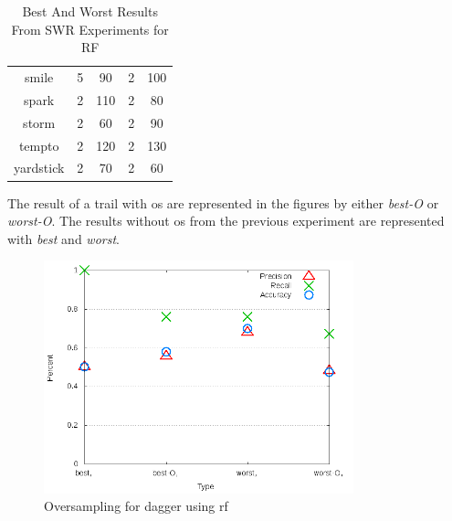 \begin{table}[ht]
\begin{center}
\begin{tabular}{|c|c|c|c|c|}
        smile & 5 & 90 & 2 & 100 \\
        spark & 2 & 110 & 2 & 80 \\
        storm & 2 & 60 & 2 & 90 \\
        tempto & 2 & 120 & 2 & 130 \\
        yardstick & 2 & 70 & 2 & 60 \\
        \hline
    \end{tabular}
    \caption{Best And Worst Results From SWR Experiments for RF}
    \label{tab:rf_best_worst_swr_experiment_sets}
\end{center}
\end{table}

The result of a trail with \gls{os} are represented in the figures by either \textit{best-O} or \textit{worst-O}. The results without \gls{os} from the previous experiment are represented with \textit{best} and \textit{worst}.


\begin{figure}[!ht]
    \centering
        \includegraphics[width=0.8\textwidth]{images/rf/test_4/dagger_sample_range}
        \caption{Oversampling for dagger using \gls{rf}}
        \label{fig:test_4_dagger_rf}
\end{figure}

